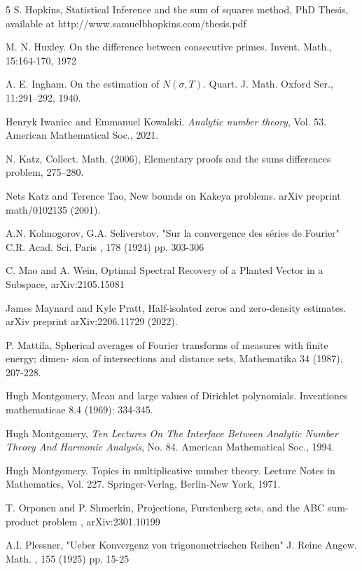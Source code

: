 \documentclass{amsart}
\begin{document}
\begin{thebibliography}{5}
 S. Hopkins, Statistical Inference and the sum of squares method, PhD Thesis, available at http://www.samuelbhopkins.com/thesis.pdf

 M. N. Huxley.  On the difference between consecutive primes. Invent. Math., 15:164-170, 1972

 A. E. Ingham. On the estimation of $N (\sigma , T )$. Quart. J. Math. Oxford Ser., 11:291–292, 1940.

  Henryk Iwaniec and Emmanuel Kowalski.  {\it Analytic number theory},  Vol. 53. American Mathematical Soc., 2021.

 N. Katz, Collect. Math. (2006), Elementary proofs and the sums differences problem, 275–280.

 Nets Katz and Terence Tao,  New bounds on Kakeya problems. arXiv preprint math/0102135 (2001).

 A.N. Kolmogorov, G.A. Seliverstov, "Sur la convergence des séries de Fourier" C.R. Acad. Sci. Paris , 178 (1924) pp. 303-306

 C. Mao and A. Wein, Optimal Spectral Recovery of a Planted Vector in a Subspace, arXiv:2105.15081 

 James Maynard and Kyle Pratt, Half-isolated zeros and zero-density estimates. arXiv preprint arXiv:2206.11729 (2022).

 P. Mattila, Spherical averages of Fourier transforms of measures with finite energy; dimen-
sion of intersections and distance sets, Mathematika 34 (1987), 207-228.

 Hugh Montgomery,  Mean and large values of Dirichlet polynomials. Inventiones mathematicae 8.4 (1969): 334-345.

 Hugh Montgomery,  {\it Ten Lectures On The Interface Between Analytic Number Theory And Harmonic Analysis}, No. 84. American Mathematical Soc., 1994.

 Hugh Montgomery. Topics in multiplicative number theory. Lecture Notes in Mathematics, Vol. 227.
Springer-Verlag, Berlin-New York, 1971.

 T. Orponen and P. Shmerkin,  Projections, Furstenberg sets, and the ABC sum-product problem ,  arXiv:2301.10199

 A.I. Plessner, "Ueber Konvergenz von trigonometrischen Reihen" J. Reine Angew. Math. , 155 (1925) pp. 15-25


\end{thebibliography}
\end{document}
